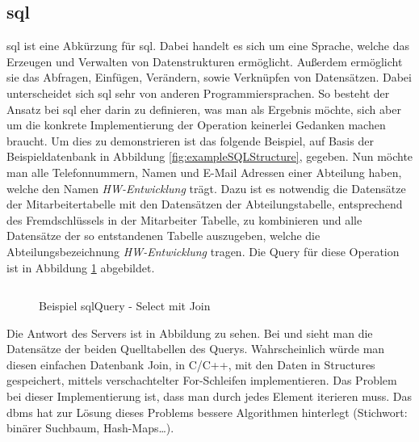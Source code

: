 \subsection{\acs{sql}}\label{subsec:sql}
\acs{sql} ist eine Abkürzung für \acl{sql}. Dabei handelt es sich um eine Sprache, 
welche das Erzeugen und Verwalten von Datenstrukturen ermöglicht. 
Außerdem ermöglicht sie das Abfragen, Einfügen, Verändern, sowie Verknüpfen von Datensätzen.
Dabei unterscheidet sich \ac{sql} sehr von anderen Programmiersprachen.
So besteht der Ansatz bei \ac{sql} eher darin zu definieren, was man als Ergebnis möchte, 
sich aber um die konkrete Implementierung der Operation keinerlei Gedanken machen braucht.
Um dies zu demonstrieren ist das folgende Beispiel, auf Basis der Beispieldatenbank in Abbildung \ref{fig:exampleSQLStructure}, gegeben.
Nun möchte man alle Telefonnummern, Namen und E-Mail Adressen einer Abteilung haben, welche den Namen \emph{HW-Entwicklung} trägt.
Dazu ist es notwendig die Datensätze der Mitarbeitertabelle mit den Datensätzen der Abteilungstabelle, 
entsprechend des Fremdschlüssels in der Mitarbeiter Tabelle, zu kombinieren und alle Datensätze der so entstandenen Tabelle auszugeben, 
welche die Abteilungsbezeichnung \emph{HW-Entwicklung} tragen. 
Die Query für diese Operation ist in Abbildung \ref{fig:exampleSQLQuery} abgebildet.
\begin{figure}[hbt]
  \inputminted{sql}{content/hauptteil/theoretischeGrundlagen/rec/sqlQuery.sql}
  \caption{Beispiel sqlQuery - Select mit Join}
  \label{fig:exampleSQLQuery}
\end{figure}
Die Antwort des Servers ist in Abbildung  zu sehen.
Bei  und  sieht man die Datensätze der beiden Quelltabellen des Querys.
Wahrscheinlich würde man diesen einfachen Datenbank Join, in C/C++, mit den Daten in Structures gespeichert, mittels verschachtelter For-Schleifen implementieren. 
Das Problem bei dieser Implementierung ist, dass man durch jedes Element iterieren muss.
Das \ac{dbms} hat zur Lösung dieses Problems bessere Algorithmen hinterlegt (Stichwort: binärer Suchbaum, Hash-Maps\dots).

